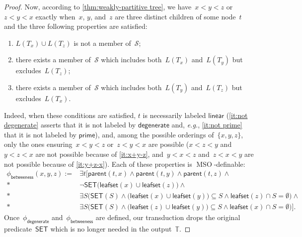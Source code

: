 \documentclass{lmcs} %
\newcommand{\MSO}{\ensuremath{\operatorname{MSO}}\xspace}
\newcommand{\betweeness}{\mathsf{betweeness}}
\newcommand{\parent}{\ensuremath{\mathsf{parent}}\xspace}
\newcommand{\SET}{\ensuremath{\mathsf{SET}}\xspace}
\newcommand{\leafset}{\ensuremath{\mathsf{leafset}}\xspace}
\newcommand\DEGENERATE{\ensuremath{\mathsf{degenerate}}\xspace}
\newcommand\PRIME{\ensuremath{\mathsf{prime}}\xspace}
\newcommand\LINEAR{\ensuremath{\mathsf{linear}}\xspace}
\def\eg{{\em e.g.}}
\begin{document}
\begin{proof}
    Now, according to \autoref{thm:weakly-partitive tree},
    we have~$x<y<z$ or~$z<y<x$ exactly when~$x$, $y$, and~$z$ are three distinct children of some node~$t$
    and the three following properties are satisfied:
    \begin{enumerate}[nosep]
        \item\label{it:not degenerate} $L(T_x)\cup L(T_z)$ is not a member of~$\mathcal{S}$;
        \item\label{it:not prime}\label{it:x+y-z} there exists a member of~$\mathcal{S}$ which includes both~$L(T_x)$ and~$L(T_y)$ but excludes~$L(T_z)$;
        \item\label{it:betweeness}\label{it:y+z-x} there exists a member of~$\mathcal{S}$ which includes both~$L(T_y)$ and~$L(T_z)$ but excludes~$L(T_x)$.
    \end{enumerate}
    Indeed,
    when these conditions are satisfied, $t$ is necessarily labeled $\LINEAR$
    (\autoref{it:not degenerate} asserts that it is not labeled by $\DEGENERATE$ and, \eg, \autoref{it:not prime} that it is not labeled by $\PRIME$),
    and, among the possible orderings of~$\{x,y,z\}$, only the ones ensuring~$x<y<z$ or~$z<y<x$ are possible
    ($x<z<y$ and~$y<z<x$ are not possible because of \autoref{it:x+y-z},
    and~$y<x<z$ and~$z<x<y$ are not possible because of \autoref{it:y+z-x}).
    Each of these properties is \MSO-definable:
    \begin{align*}
        \phi_{\betweeness}(x,y,z):=&
            \exists t\Big[ \parent(t,x)\land\parent(t,y)\land\parent(t,z)\land 
            \\*
            &\neg\SET\big(\leafset(x)\cup\leafset(z)\big)\land
            \\*
            &\exists S\Big(\SET(S)\land\big(\leafset(x)\cup\leafset(y)\big)\subseteq S\land\leafset(z)\cap S=\emptyset\Big)\land
            \\*
            &\exists S\Big(\SET(S)\land\big(\leafset(z)\cup\leafset(y)\big)\subseteq S\land\leafset(x)\cap S=\emptyset\Big)\Big].
    \end{align*}
    Once~$\phi_{\DEGENERATE}$ and~$\phi_{\betweeness}$ are defined,
    our transduction drops the original predicate~$\SET$
    which is no longer needed in the output~$\mathbb{T}$.
\end{proof}
\end{document}
